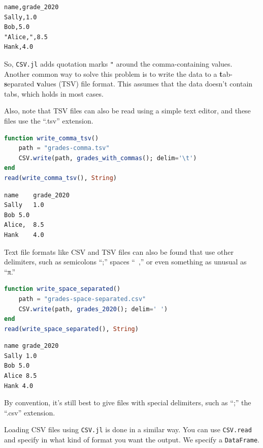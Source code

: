\documentclass[
  notoc %
]{tufte-book}
\newcommand{\passthrough}[1]{#1}
\begin{document}
\begin{lstlisting}[language=Output]
name,grade_2020
Sally,1.0
Bob,5.0
"Alice,",8.5
Hank,4.0

\end{lstlisting}

So, \passthrough{\lstinline!CSV.jl!} adds quotation marks
\passthrough{\lstinline!"!} around the comma-containing values. Another
common way to solve this problem is to write the data to a
\textbf{t}ab-\textbf{s}eparated \textbf{v}alues (TSV) file format. This
assumes that the data doesn't contain tabs, which holds in most cases.

Also, note that TSV files can also be read using a simple text editor,
and these files use the ``.tsv'' extension.

\begin{lstlisting}[language=Julia]
function write_comma_tsv()
    path = "grades-comma.tsv"
    CSV.write(path, grades_with_commas(); delim='\t')
end
read(write_comma_tsv(), String)
\end{lstlisting}

\begin{lstlisting}[language=Output]
name    grade_2020
Sally   1.0
Bob 5.0
Alice,  8.5
Hank    4.0

\end{lstlisting}

Text file formats like CSV and TSV files can also be found that use
other delimiters, such as semicolons ``;'' spaces ``~,'' or even
something as unusual as ``π.''

\begin{lstlisting}[language=Julia]
function write_space_separated()
    path = "grades-space-separated.csv"
    CSV.write(path, grades_2020(); delim=' ')
end
read(write_space_separated(), String)
\end{lstlisting}

\begin{lstlisting}[language=Output]
name grade_2020
Sally 1.0
Bob 5.0
Alice 8.5
Hank 4.0

\end{lstlisting}

By convention, it's still best to give files with special delimiters,
such as ``;'' the ``.csv'' extension.

Loading CSV files using \passthrough{\lstinline!CSV.jl!} is done in a
similar way. You can use \passthrough{\lstinline!CSV.read!} and specify
in what kind of format you want the output. We specify a
\passthrough{\lstinline!DataFrame!}.
\end{document}
